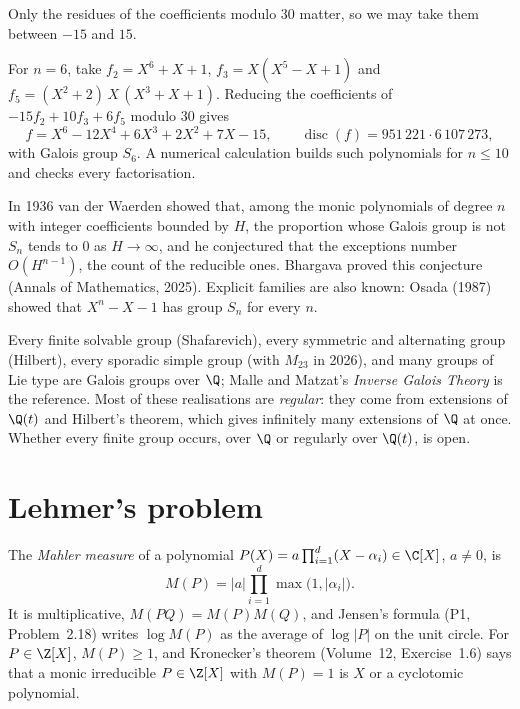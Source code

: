 Only the residues of the coefficients modulo $30$ matter, so we may take them between $-15$ and $15$.

\begin{example}\label{conjectures:exa:sextic}
For $n=6$, take $f_2=X^6+X+1$, $f_3=X(X^5-X+1)$ and $f_5=(X^2+2)\,X\,(X^3+X+1)$. Reducing the coefficients of $-15f_2+10f_3+6f_5$ modulo $30$ gives
\[
f=X^6-12X^4+6X^3+2X^2+7X-15,\qquad \operatorname{disc}(f)=951\,221\cdot6\,107\,273,
\]
with Galois group $S_6$. A numerical calculation builds such polynomials for $n\le10$ and checks every factorisation.
\end{example}

\begin{remark}\label{conjectures:rem:vdw}
In 1936 van der Waerden showed that, among the monic polynomials of degree $n$ with integer coefficients bounded by $H$, the proportion whose Galois group is
not $S_n$ tends to $0$ as $H\to\infty$, and he conjectured that the exceptions number $O(H^{n-1})$, the count of the reducible ones. Bhargava proved this
conjecture (Annals of Mathematics, 2025). Explicit families are also known: Osada (1987) showed that $X^n-X-1$ has group $S_n$ for every $n$.
\end{remark}

\begin{remark}\label{conjectures:rem:igpknown}
Every finite solvable group (Shafarevich), every symmetric and alternating group (Hilbert), every sporadic simple group (with $M_{23}$ in 2026), and many
groups of Lie type are Galois groups over $\Q$; Malle and Matzat's \emph{Inverse Galois Theory} is the reference. Most of these realisations are
\emph{regular}: they come from extensions of $\Q(t)$ and Hilbert's theorem, which gives infinitely many extensions of $\Q$ at once. Whether every finite
group occurs, over $\Q$ or regularly over $\Q(t)$, is open.
\end{remark}

\section{Lehmer's problem}

The \emph{Mahler measure} of a polynomial $P(X)=a\prod_{i=1}^d(X-\alpha_i)\in\C[X]$, $a\ne0$, is
\[
M(P)=|a|\prod_{i=1}^d\max\bigl(1,|\alpha_i|\bigr).
\]
It is multiplicative, $M(PQ)=M(P)M(Q)$, and Jensen's formula (P1, Problem~2.18) writes $\log M(P)$ as the average of $\log|P|$ on the unit circle. For
$P\in\Z[X]$, $M(P)\ge1$, and Kronecker's theorem (Volume~12, Exercise~1.6) says that a monic irreducible $P\in\Z[X]$ with $M(P)=1$ is $X$ or a
cyclotomic polynomial.

